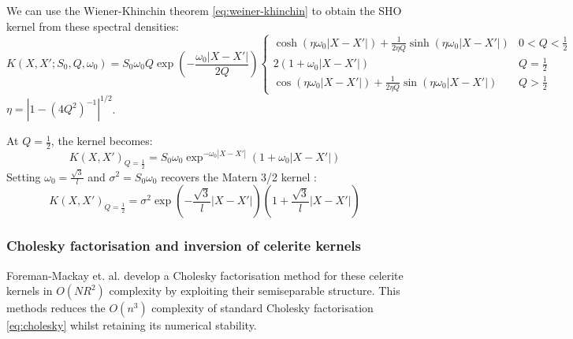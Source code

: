 We can use the Wiener-Khinchin theorem \ref{eq:weiner-khinchin} to obtain the SHO kernel from these spectral densities:
\begin{equation*}
    K(X, X'; S_0, Q, \omega_0) = S_0 \omega_0 Q \exp \left( -\frac{\omega_0 |X - X'|}{2Q} \right) \begin{cases}
            \cosh (\eta \omega_0 |X - X'|) + \frac{1}{2 \eta Q} \sinh ( \eta \omega_0 |X - X'|) & 0 < Q < \frac{1}{2} \\
            2(1 + \omega_0 |X - X'|) & Q = \frac{1}{2} \\
            \cos (\eta \omega_0 |X - X'|) + \frac{1}{2 \eta Q} \sin ( \eta \omega_0 |X - X'|) & Q > \frac{1}{2}
    \end{cases}
\end{equation*}
$\eta = |1 - (4Q^2)^{-1} |^{1/2}$. 

At $Q = \frac{1}{2}$, the kernel becomes:
\begin{equation*}
    K(X, X')_{Q = \frac{1}{2}} = S_0 \omega_0 \exp^{- \omega_0 |X - X'|} \left( 1 + \omega_0 |X - X'| \right)
\end{equation*}
Setting $\omega_0 = \frac{\sqrt{3}}{l}$ and $\sigma^2 = S_0 \omega_0$ recovers the Matern 3/2 kernel \label{eq:matern-32}:
\begin{equation*}
    K(X, X')_{Q = \frac{1}{2}} = \sigma^2 \exp \left(- \frac{\sqrt{3}}{l} |X - X'|\right) \left( 1 + \frac{\sqrt{3}}{l} |X - X'| \right)
\end{equation*}

\subsubsection{Cholesky factorisation and inversion of celerite kernels}
Foreman-Mackay et. al. \cite{foreman-mackay} develop a Cholesky factorisation method for these celerite kernels in $O(NR^2)$ complexity by exploiting their semiseparable structure. This methods reduces the $O(n^3)$ complexity of standard Cholesky factorisation \ref{eq:cholesky} whilst retaining its numerical stability.

